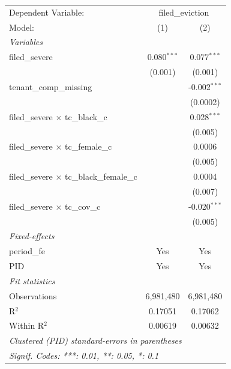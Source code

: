\par\endgroup
\begingroup
\centering
\begin{tabular}{lcc}
   \tabularnewline \midrule \midrule
   Dependent Variable: & \multicolumn{2}{c}{filed\_eviction}\\
   Model:                                           & (1)           & (2)\\  
   \midrule
   \emph{Variables}\\
   filed\_severe                                    & 0.080$^{***}$ & 0.077$^{***}$\\   
                                                    & (0.001)       & (0.001)\\   
   tenant\_comp\_missing                            &               & -0.002$^{***}$\\   
                                                    &               & (0.0002)\\   
   filed\_severe $\times$ tc\_black\_c              &               & 0.028$^{***}$\\   
                                                    &               & (0.005)\\   
   filed\_severe $\times$ tc\_female\_c             &               & 0.0006\\   
                                                    &               & (0.005)\\   
   filed\_severe $\times$ tc\_black\_female\_c      &               & 0.0004\\   
                                                    &               & (0.007)\\   
   filed\_severe $\times$ tc\_cov\_c                &               & -0.020$^{***}$\\   
                                                    &               & (0.005)\\   
   \midrule
   \emph{Fixed-effects}\\
   period\_fe                                       & Yes           & Yes\\  
   PID                                              & Yes           & Yes\\  
   \midrule
   \emph{Fit statistics}\\
   Observations                                     & 6,981,480     & 6,981,480\\  
   R$^2$                                            & 0.17051       & 0.17062\\  
   Within R$^2$                                     & 0.00619       & 0.00632\\  
   \midrule \midrule
   \multicolumn{3}{l}{\emph{Clustered (PID) standard-errors in parentheses}}\\
   \multicolumn{3}{l}{\emph{Signif. Codes: ***: 0.01, **: 0.05, *: 0.1}}\\
\end{tabular}
